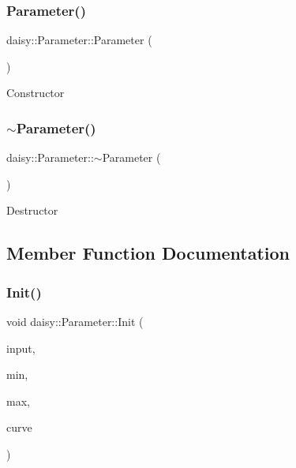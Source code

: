 \subsubsection{\texorpdfstring{Parameter()}{Parameter()}}
{\footnotesize\ttfamily daisy\+::\+Parameter\+::\+Parameter (\begin{DoxyParamCaption}{ }\end{DoxyParamCaption})\hspace{0.3cm}{\ttfamily [inline]}}

Constructor \mbox{\label{classdaisy_1_1_parameter_ad29a1b19206bc6568d085ddb4eaa14d9}} 
\subsubsection{\texorpdfstring{$\sim$\+Parameter()}{~Parameter()}}
{\footnotesize\ttfamily daisy\+::\+Parameter\+::$\sim$\+Parameter (\begin{DoxyParamCaption}{ }\end{DoxyParamCaption})\hspace{0.3cm}{\ttfamily [inline]}}

Destructor 

\subsection{Member Function Documentation}
\mbox{\label{classdaisy_1_1_parameter_a0dc0293e425569511a73c311bfa54f48}} 
\subsubsection{\texorpdfstring{Init()}{Init()}}
{\footnotesize\ttfamily void daisy\+::\+Parameter\+::\+Init (\begin{DoxyParamCaption}\item[{\hyperlink{classdaisy_1_1_analog_control}{Analog\+Control}}]{input,  }\item[{float}]{min,  }\item[{float}]{max,  }\item[{\hyperlink{classdaisy_1_1_parameter_a2fcb1b7095721f0de77594aabb9594da}{Curve}}]{curve }\end{DoxyParamCaption})}


